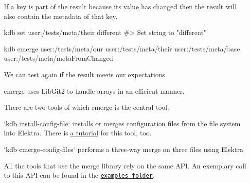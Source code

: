 If a key is part of the result because its value has changed then the result will also contain the metadata of that key.


\begin{DoxyCode}
kdb set user:/tests/meta/their different
#> Set string to "different"

kdb cmerge user:/tests/meta/our user:/tests/meta/their user:/tests/meta/base
       user:/tests/meta/metaFromChanged
\end{DoxyCode}


We can test again if the result meets our expectations.




cmerge uses Lib\+Git2 to handle arrays in an efficient manner.




There are two tools of which cmerge is the central tool\+:


\begin{DoxyEnumerate}
\item \hyperlink{doc_help_kdb-install-config-file_md}{`kdb install-\/config-\/file`} installs or merges configuration files from the file system into Elektra. There is \hyperlink{doc_tutorials_install-config-files_md}{a tutorial} for this tool, too.
\item `kdb cmerge-\/config-\/files` performs a three-\/way merge on three files using Elektra
\end{DoxyEnumerate}

All the tools that use the merge library rely on the same A\+PI. An exemplary call to this A\+PI can be found in the \href{/home/jenkins/workspace/libelektra-release/examples/kdbset.c}{\tt examples folder}. 